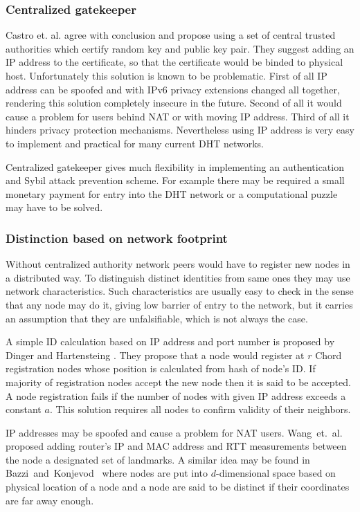   \subsubsection{Centralized gatekeeper}
  Castro et. al. \cite{cas02} agree with \cite{dou02} conclusion and propose
  using a set of central trusted authorities which certify random key and public
  key pair. They suggest adding an IP address to the certificate, so that the
  certificate would be binded to physical host. Unfortunately this solution is
  known to be problematic. First of all IP address can be spoofed and with IPv6
  privacy extensions changed all together, rendering this solution completely
  insecure in the future. Second of all it would cause a problem for users
  behind NAT or with moving IP address. Third of all it hinders privacy
  protection mechanisms. Nevertheless using IP address is very easy to implement
  and practical for many current DHT networks.

  Centralized gatekeeper gives much flexibility in implementing an
  authentication and Sybil attack prevention scheme. For example there may be
  required a small monetary payment for entry into the DHT network or a
  computational puzzle may have to be solved.

  \subsubsection{Distinction based on network footprint}

  Without centralized authority network peers would have to register new nodes
  in a distributed way. To distinguish distinct identities from same ones they
  may use network characteristics. Such characteristics are usually easy to
  check in the sense that any node may do it, giving low barrier of entry to the
  network, but it carries an assumption that they are unfalsifiable, which is
  not always the case.

  A simple ID calculation based on IP address and port number is proposed by
  Dinger and Hartensteing \cite[p. 6]{dou02}. They propose that a node would
  register at $r$ Chord registration nodes whose position is calculated from
  hash of node's ID. If majority of registration nodes accept the new node then
  it is said to be accepted. A node registration fails if the number of nodes
  with given IP address exceeds a constant $a$. This solution requires all nodes
  to confirm validity of their neighbors.

  IP addresses may be spoofed and cause a problem for NAT users.
  Wang~et.~al.~\cite[p. 7]{dou02} proposed adding router's IP and MAC address
  and RTT measurements between the node a designated set of landmarks. A similar
  idea may be found in Bazzi~and~Konjevod~\cite[p. 7]{dou02} where nodes are put
  into $d$-dimensional space based on physical location of a node and a node are
  said to be distinct if their coordinates are far away enough.

